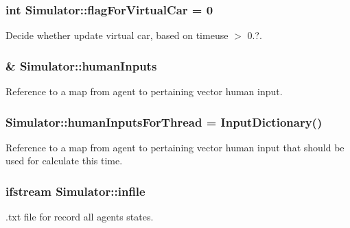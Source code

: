 \subsubsection[{\texorpdfstring{flag\+For\+Virtual\+Car}{flagForVirtualCar}}]{\setlength{\rightskip}{0pt plus 5cm}int Simulator\+::flag\+For\+Virtual\+Car = 0\hspace{0.3cm}{\ttfamily [static]}}\hypertarget{classSimulator_ab9f7b36020e146f22b493267fc630f82}{}\label{classSimulator_ab9f7b36020e146f22b493267fc630f82}
Decide whether update virtual car, based on timeuse $>$ 0.?. 
\subsubsection[{\texorpdfstring{human\+Inputs}{humanInputs}}]{\& Simulator\+::human\+Inputs\hspace{0.3cm}{\ttfamily [private]}}\hypertarget{classSimulator_a5d1671432b317ac4ddb63acb0267388b}{}\label{classSimulator_a5d1671432b317ac4ddb63acb0267388b}
Reference to a map from agent to pertaining vector human input. 
\subsubsection[{\texorpdfstring{human\+Inputs\+For\+Thread}{humanInputsForThread}}]{ Simulator\+::human\+Inputs\+For\+Thread = {\bf Input\+Dictionary}()\hspace{0.3cm}{\ttfamily [static]}}\hypertarget{classSimulator_ae91cf2cc1bc4365ea0a6072e5d2accf5}{}\label{classSimulator_ae91cf2cc1bc4365ea0a6072e5d2accf5}
Reference to a map from agent to pertaining vector human input that should be used for calculate this time. 
\subsubsection[{\texorpdfstring{infile}{infile}}]{\setlength{\rightskip}{0pt plus 5cm}ifstream Simulator\+::infile\hspace{0.3cm}{\ttfamily [static]}}\hypertarget{classSimulator_a41ca99de68be458860955dec68b04aad}{}\label{classSimulator_a41ca99de68be458860955dec68b04aad}
.txt file for record all agents states. 
